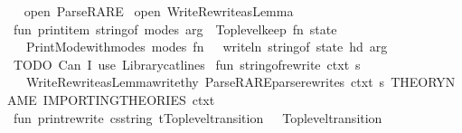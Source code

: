 \begin{isabellebody}
\isanewline
\isanewline
\isanewline
{}\isamarkupfalse%
\ {\isacartoucheopen}\isanewline
\ open\ Parse{\isacharunderscore}{\kern0pt}RARE\isanewline
\ open\ Write{\isacharunderscore}{\kern0pt}Rewrite{\isacharunderscore}{\kern0pt}as{\isacharunderscore}{\kern0pt}Lemma\isanewline
\isanewline
\ fun\ print{\isacharunderscore}{\kern0pt}item\ string{\isacharunderscore}{\kern0pt}of\ {\isacharparenleft}{\kern0pt}modes{\isacharcomma}{\kern0pt}\ arg{\isacharparenright}{\kern0pt}\ {\isacharequal}{\kern0pt}\ Toplevel{\isachardot}{\kern0pt}keep\ {\isacharparenleft}{\kern0pt}fn\ state\ {\isacharequal}{\kern0pt}{\isachargreater}{\kern0pt}\isanewline
\ \ \ Print{\isacharunderscore}{\kern0pt}Mode{\isachardot}{\kern0pt}with{\isacharunderscore}{\kern0pt}modes\ modes\ {\isacharparenleft}{\kern0pt}fn\ {\isacharparenleft}{\kern0pt}{\isacharparenright}{\kern0pt}\ {\isacharequal}{\kern0pt}{\isachargreater}{\kern0pt}\ writeln\ {\isacharparenleft}{\kern0pt}string{\isacharunderscore}{\kern0pt}of\ state\ {\isacharparenleft}{\kern0pt}hd\ arg{\isacharparenright}{\kern0pt}{\isacharparenright}{\kern0pt}{\isacharparenright}{\kern0pt}\ {\isacharparenleft}{\kern0pt}{\isacharparenright}{\kern0pt}{\isacharparenright}{\kern0pt}\isanewline
\isanewline
\ {\isacharparenleft}{\kern0pt}{\isacharasterisk}{\kern0pt}TODO{\isacharcolon}{\kern0pt}\ Can\ I\ use{\isacharcolon}{\kern0pt}\ Library{\isachardot}{\kern0pt}cat{\isacharunderscore}{\kern0pt}lines{\isacharquery}{\kern0pt}{\isacharasterisk}{\kern0pt}{\isacharparenright}{\kern0pt}\isanewline
\ fun\ string{\isacharunderscore}{\kern0pt}of{\isacharunderscore}{\kern0pt}rewrite\ ctxt\ s\isanewline
\ \ {\isacharequal}{\kern0pt}\ {\isacharparenleft}{\kern0pt}Write{\isacharunderscore}{\kern0pt}Rewrite{\isacharunderscore}{\kern0pt}as{\isacharunderscore}{\kern0pt}Lemma{\isachardot}{\kern0pt}write{\isacharunderscore}{\kern0pt}thy\ {\isacharparenleft}{\kern0pt}Parse{\isacharunderscore}{\kern0pt}RARE{\isachardot}{\kern0pt}parse{\isacharunderscore}{\kern0pt}rewrites\ ctxt\ {\isacharbrackleft}{\kern0pt}s{\isacharbrackright}{\kern0pt}{\isacharparenright}{\kern0pt}\ {\isachardoublequote}{\kern0pt}THEORY{\isacharunderscore}{\kern0pt}NAME{\isachardoublequote}{\kern0pt}\ {\isachardoublequote}{\kern0pt}IMPORTING{\isacharunderscore}{\kern0pt}THEORIES{\isachardoublequote}{\kern0pt}\ ctxt{\isacharparenright}{\kern0pt}\isanewline
\isanewline
\ fun\ print{\isacharunderscore}{\kern0pt}rewrite\ {\isacharparenleft}{\kern0pt}cs{\isacharcolon}{\kern0pt}string{\isacharparenright}{\kern0pt}\ {\isacharparenleft}{\kern0pt}t{\isacharcolon}{\kern0pt}Toplevel{\isachardot}{\kern0pt}transition{\isacharparenright}{\kern0pt}\ {\isacharcolon}{\kern0pt}\ \ Toplevel{\isachardot}{\kern0pt}transition\ {\isacharequal}{\kern0pt}\isanewline

\end{isabellebody}
